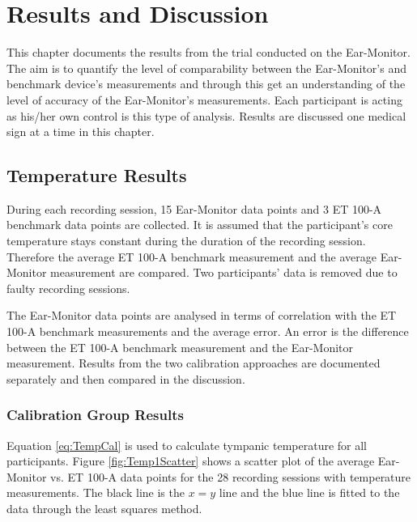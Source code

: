 \chapter{Results and Discussion}
\label{chp:Results and Discussion}
This chapter documents the results from the trial conducted on the Ear-Monitor. The aim is to quantify the level of comparability between the Ear-Monitor's and benchmark device's measurements and through this get an understanding of the level of accuracy of the Ear-Monitor's measurements. Each participant is acting as his/her own control is this type of analysis. Results are discussed one medical sign at a time in this chapter.

\section{Temperature Results}
During each recording session, 15 Ear-Monitor data points and 3 ET 100-A benchmark data points are collected. It is assumed that the participant's core temperature stays constant during the duration of the recording session. Therefore the average ET 100-A benchmark measurement and the average Ear-Monitor measurement are compared. Two participants' data is removed due to faulty recording sessions.

\medskip

The Ear-Monitor data points are analysed in terms of correlation with the ET 100-A benchmark measurements and the average error. An error is the difference between the ET 100-A benchmark measurement and the Ear-Monitor measurement. Results from the two calibration approaches are documented separately and then compared in the discussion.

\subsection{Calibration Group Results}
Equation \ref{eq:TempCal} is used to calculate tympanic temperature for all participants. Figure \ref{fig:Temp1Scatter} shows a scatter plot of the average Ear-Monitor vs. ET 100-A data points for the 28 recording sessions with temperature measurements. The black line is the $x=y$ line and the blue line is fitted to the data through the least squares method.

